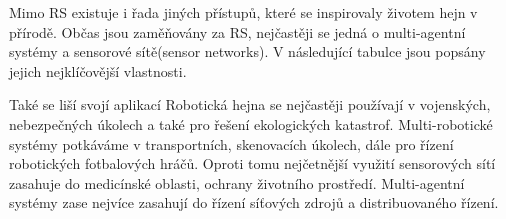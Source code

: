 \par 
Mimo RS existuje i řada jiných přístupů, které se inspirovaly životem hejn v přírodě. Občas jsou zaměňovány za RS, nejčastěji se jedná o multi-agentní systémy a sensorové sítě(sensor networks). V následující tabulce jsou popsány jejich nejklíčovější vlastnosti. \par
\begin{center}
    \begin{table} 
    \end{table}
    \end{center}
    Také se liší svojí aplikací Robotická hejna se nejčastěji používají v vojenských, nebezpečných úkolech a také pro řešení ekologických katastrof. Multi-robotické systémy potkáváme v transportních, skenovacích úkolech, dále pro řízení robotických fotbalových hráčů. Oproti tomu nejčetnější využití sensorových sítí zasahuje do medicínské oblasti, ochrany životního prostředí. Multi-agentní systémy zase nejvíce zasahují do řízení síťových zdrojů a distribuovaného řízení. 
